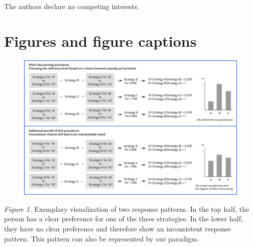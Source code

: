 \documentclass[
  man,floatsintext]{apa6}
\begin{document}
The authors declare no competing interests.

\newpage
\setcounter{figure}{0}

\hypertarget{figures-and-figure-captions}{%
\section{Figures and figure captions}\label{figures-and-figure-captions}}

\newpage

\begin{figure}
\includegraphics[width=\textwidth]{figures/Paradigm_Scheme_T2} \caption{ }\label{fig:ResponsePatternsAppendix}
\end{figure}

\emph{Figure 1.} Exemplary visualization of two response patterns.
In the top half, the person has a clear preference for one of the three strategies.
In the lower half, they have no clear preference and therefore show an inconsistent response pattern.
This pattern can also be represented by our paradigm.
\end{document}
